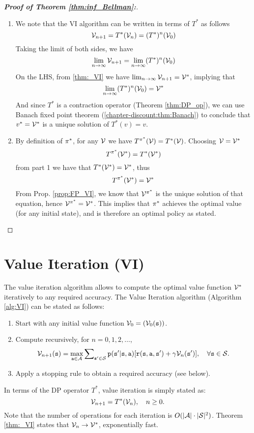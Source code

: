 \begin{proof}[\textbf{Proof of Theorem \ref{thm:inf_Bellman}:}]
\begin{enumerate}
\item
We note that the VI algorithm can be written in terms of $T^*$ as follows
\[\mathcal{V}_{n+1} = T^{*}(\mathcal{V}_{n}) = (T^{*})^{n}(\mathcal{V}_{0})\]
Taking the limit of both sides, we have
\[\lim_{n\to\infty}\mathcal{V}_{n+1} = \lim_{n\to\infty}(T^{*})^{n}(\mathcal{V}_{0})\]
On the LHS, from \ref{thm:_VI} we have $\lim_{n\to\infty}\mathcal{V}_{n+1} = \mathcal{V}^{*}$, implying that
\[\lim_{n\to\infty}(T^{*})^{n}(\mathcal{V}_{0})= \mathcal{V}^{*}\]
And since $T^*$ is a contraction operator (Theorem \ref{thm:DP_op}),
we can use Banach fixed point theorem (\ref{chapter-discount:thm:Banach}) 
to conclude that $v^{*} = \mathcal{V}^{*}$ is a unique solution of $T^*(v) = v$.
\item 
By definition of  ${\pi^*}$, for any $\mathcal{V}$ 
we have $T^{\pi^*}(\mathcal{V}) = T^*(\mathcal{V})$.
Choosing $\mathcal{V}=\mathcal{V}^{*}$
\[T^{\pi^*}(\mathcal{V}^{*}) = T^*(\mathcal{V}^{*})\]
from part 1 we have that $T^*(\mathcal{V}^*) = \mathcal{V}^*$, thus
\[T^{\pi^*}(\mathcal{V}^*) = \mathcal{V}^*\]
From Prop. \ref{prop:FP_VI}, we know that
$\mathcal{V}_{}^{\pi^*}$ is the unique solution of that equation,
hence $\mathcal{V}_{}^{\pi^*} = \mathcal{V}_{}^*$. This implies that
${\pi ^*}$ achieves the optimal value (for any initial state),
and is therefore an optimal policy as stated.
\end{enumerate}
\end{proof}

\section{Value Iteration (VI)}
\label{sec:VI}

The value iteration algorithm allows to compute the optimal value
function ${\mathcal{V}^*}$ iteratively to any required accuracy. The
Value Iteration algorithm (Algorithm \ref{alg:VI}) can be stated as
follows:
\begin{enumerate}
  \item Start with any initial value function ${\mathcal{V}_0} = ({\mathcal{V}_0}({\tt s}))$.
  \item Compute recursively, for $n = 0,1,2, \ldots $,
          \[{\mathcal{V}_{n + 1}}({\tt s}) = \mathop {\max }\limits_{{\tt a} \in \mathcal{A}} \sum\nolimits_{{\tt s}' \in \mathcal{S}} {{\tt p}({\tt s}'|{\tt s},{\tt a})[{\tt r}({\tt s},{\tt a},{\tt s}') + \gamma {\mathcal{V}_n}({\tt s}')]} ,       \quad \forall {\tt s} \in \mathcal{S}.\]
  \item Apply a stopping rule to obtain a required accuracy (see below).
\end{enumerate}
In terms of the DP operator $T_{}^*$, value iteration is simply stated as:
\[{\mathcal{V}_{n + 1}} = T_{}^*({\mathcal{V}_n}), \quad n \ge 0.\]
Note that the number of operations for each iteration is
$O(|\mathcal{A}| \cdot |\mathcal{S}|^2)$. Theorem \ref{thm:_VI} states that
${\mathcal{V}_n} \to \mathcal{V}_{}^*$, exponentially fast. %




